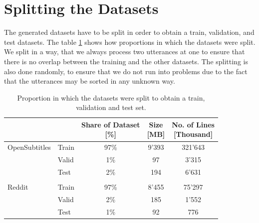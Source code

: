 \section{Splitting the Datasets}
\label{data:split_corpus}
The generated datasets have to be split in order to obtain a train, validation, and test datasets. The table \ref{tbl:data:split:corpus} shows how proportions in which the datasets were split. We split in a way, that we always process two utterances at one to ensure that there is no overlap between the training and the other datasets. The splitting is also done randomly, to ensure that we do not run into problems due to the fact that the utterances may be sorted in any unknown way.
\\
\begin{table}[H]
	\centering
	\begin{adjustbox}{max width=\textwidth}
		\centering
		\begin{tabular}{llccc}
			\toprule
			&  \specialcell{Set}
			&  \specialcell{Share of Dataset \\ {[\%]}}
			&  \specialcell{Size \\{[MB]}}
			&  \specialcell{No. of Lines \\{[Thousand]}}\\
			\midrule
			OpenSubtitles	& Train	&97\%	&9'393	&321'643	\\
			&Valid	&1\%	&97		&3'315	\\
			&Test	&2\%	&194	&6'631	\\\\
			Reddit			&Train	&97\%	&8'455	&75'297	\\
			&Valid	&2\%	&185	&1'552	\\
			&Test	&1\%	&92		&776	\\
			\bottomrule
		\end{tabular}
	\end{adjustbox}
	\caption{Proportion in which the datasets were split to obtain a train, validation and test set.}
	\label{tbl:data:split:corpus}
\end{table}

